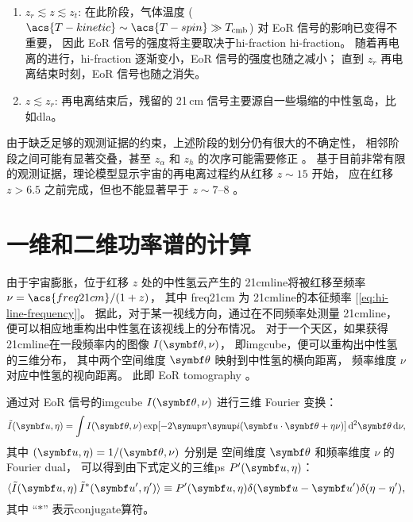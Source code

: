 \begin{enumerate}
  \item $z_r \lesssim z \lesssim z_t$:
    在此阶段，气体温度 ($\acs{T-kinetic} \sim \acs{T-spin} \gg T_{\R{cmb}}$)
    对 EoR 信号的影响已变得不重要，
    因此 EoR 信号的强度将主要取决于\acl{hi-fraction} \acs{hi-fraction}。
    随着再电离的进行，\acs{hi-fraction} 逐渐变小，EoR 信号的强度也随之减小；
    直到 $z_r$ 再电离结束时刻，EoR 信号也随之消失。

  \item $z \lesssim z_r$:
    再电离结束后，残留的 21\,cm 信号主要源自一些塌缩的中性氢岛，比如\ac{dla}。
\end{enumerate}

由于缺乏足够的观测证据的约束，上述阶段的划分仍有很大的不确定性，
相邻阶段之间可能有显著交叠，甚至 $z_{\alpha}$ 和 $z_h$ 的次序可能需要修正
\cite{nusser2005,pritchard2012}。
基于目前非常有限的观测证据，理论模型显示宇宙的再电离过程约从红移 $z \sim 15$ 开始，
应在红移 $z > 6.5$ 之前完成，但也不能显著早于 $z \sim \numrange{7}{8}$
\cite{choudhury2006,pritchard2010mn}。


\section{一维和二维功率谱的计算}
\label{sec:ps}

由于宇宙膨胀，位于红移 $z$ 处的中性氢云产生的 \ac{21cmline}将被红移至频率
$\nu = \acs{freq21cm} / (1 + z)$，
其中 \acs{freq21cm} 为 \ac{21cmline}的本征频率
[\autoref{eq:hi-line-frequency}]。
据此，对于某一视线方向，通过在不同频率处测量 \ac{21cmline}，
便可以相应地重构出中性氢在该视线上的分布情况。
对于一个天区，如果获得 \ac{21cmline}在一段频率内的图像 $I(\B{\theta},\nu)$，
即\ac{imgcube}，便可以重构出中性氢的三维分布，
其中两个空间维度 $\B{\theta}$ 映射到中性氢的横向距离，
频率维度 $\nu$ 对应中性氢的视向距离。
此即 EoR \acf{tomography} \cite{mellema2015}。

通过对 EoR 信号的\ac{imgcube} $I(\B{\theta},\nu)$ 进行三维 Fourier 变换：
\begin{equation}
  \label{eq:ft3d}
  \tilde{I}(\B{u}, \eta) =
    \int I(\B{\theta},\nu) \exp[ -2\Cpi\Ci (\B{u}\cdot\B{\theta} + \eta\nu) ]
    \,\mathrm{d}^2\B{\theta}\,\D{\nu} ,
\end{equation}
其中 $(\B{u}, \eta) = 1 / (\B{\theta}, \nu)$ 分别是
空间维度 $\B{\theta}$ 和频率维度 $\nu$ 的 Fourier \ac{dual}，
可以得到由下式定义的三维\ac{ps} $P'(\B{u}, \eta)$：
\begin{equation}
  \label{eq:ps3d}
  \langle \tilde{I}(\B{u}, \eta) \, \tilde{I}^*(\B{u}', \eta') \rangle
    \equiv P'(\B{u}, \eta) \delta(\B{u}-\B{u}') \delta(\eta-\eta') ,
\end{equation}
其中 \enquote{$*$} 表示\ac{conjugate}算符。

